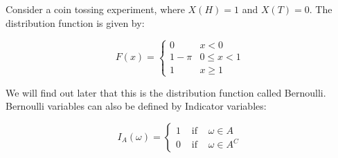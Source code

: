 \documentclass[12pt]{extbook}
\begin{document}
Consider a coin tossing experiment, where $X(H)=1$ and $X(T)=0$.   The distribution function is given by:

\begin{displaymath}
F(x) = \left\{ \begin{array}{ll} 0 & x < 0 \\ 1-\pi & 0  \leq x < 1 \\ 1 & x  \geq 1 \end{array} \right.
\end{displaymath}

We will find out later that this is the distribution function called Bernoulli.   Bernoulli variables can also be defined by Indicator variables:

\begin{displaymath}
I_A(\omega) =\left\{ \begin{array}{lrl} 1 & \mbox{ if } & \omega \in A \\ 0 & \mbox{ if } & \omega \in A^C \end{array} \right.
\end{displaymath}











\end{document}
